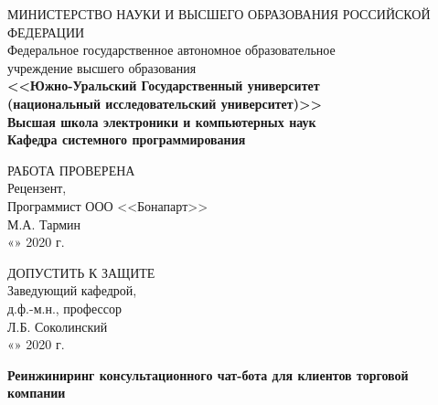 \begin{titlepage}
    \begin{center}
        \footnotesize
        МИНИСТЕРСТВО НАУКИ И ВЫСШЕГО ОБРАЗОВАНИЯ РОССИЙСКОЙ ФЕДЕРАЦИИ\\
        \small
        Федеральное государственное автономное образовательное\\
        учреждение высшего образования\\
        \normalsize
        \textbf{
        <<Южно-Уральский Государственный университет\\
        (национальный исследовательский университет)>>\\
        \small
        Высшая школа электроники и компьютерных наук\\
        Кафедра системного программирования
        \normalsize
        }
        \bigskip
        
        \noindent
        \newline
        \begin{minipage}{0.5\textwidth}
            РАБОТА ПРОВЕРЕНА\\
            Рецензент,\\
            Программист ООО <<Бонапарт>>\\
            \underline{\hspace{2cm}} М.А. Тармин\\
            «\underline{\hspace{0.7cm}}» \underline{\hspace{2cm}} 2020 г.
        \end{minipage}
        \vspace{\fill}
        \begin{minipage}{0.4\textwidth}
            ДОПУСТИТЬ К ЗАЩИТЕ\\
            Заведующий кафедрой,\\
            д.ф.-м.н., профессор\\
            \underline{\hspace{2cm}} Л.Б. Соколинский\\
            «\underline{\hspace{0.7cm}}» \underline{\hspace{2cm}} 2020 г.
        \end{minipage}

        \vfill
        \textbf{
            \Large
            Реинжиниринг консультационного чат-бота для клиентов торговой компании
            \normalsize
        }
        \bigskip
        

\end{center}
\end{titlepage}
